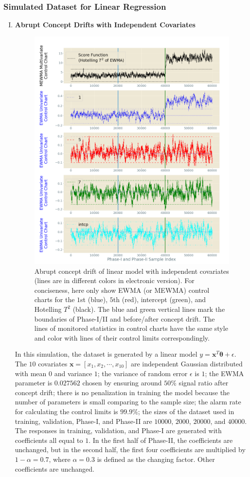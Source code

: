 \documentclass[twoside,11pt]{article}
\begin{document}
\subsubsection{Simulated Dataset for Linear Regression}
\begin{enumerate}[(I)]
\item
\textbf{Abrupt Concept Drifts with Independent Covariates}

\label{sss:lin_ind_pred}
\begin{figure}[!hpt]
\centering
  \includegraphics[width = 0.6\linewidth]{../figures/v14/sim_2/reg/neg_single_3_sim2_mlines_with_regu_1e-08_0_005.png}
  \caption{Abrupt concept drift of linear model with independent covariates (lines are in different colors in electronic version). For conciseness, here only show EWMA (or MEWMA) control charts for the $1$st (blue), $5$th (red), intercept (green), and Hotelling $T^2$ (black). The blue and green vertical lines mark the boundaries of Phase-I/II and before/after concept drift. The lines of monitored statistics in control charts have the same style and color with lines of their control limits correspondingly.}
  \label{fig:lin_reg_ind_X}
\end{figure}
In this simulation, the dataset is generated by a {linear} model $y = \bm {x}^T\bm { \theta} + \epsilon$. The $10$ {covariates} {$\bm {x}=[x_1, x_2, \cdots, x _{10}]$} are independent Gaussian distributed with mean $0$ and variance $1$; the variance of random error $ \epsilon$ is $1$; the EWMA parameter is $0.027562$ chosen by ensuring around $50\%$ signal ratio after concept drift; there is no penalization in training the model because the number of parameters is small comparing to the sample size; the alarm rate for calculating the control limits is $99.9\%$; the sizes of the dataset used in training, validation, Phase-I, and Phase-II are $10000$, $2000$, $20000$, and $40000$. The responses in training, validation, and Phase-I are generated with coefficients all equal to $1$. In the first half of Phase-II, the coefficients are unchanged, but in the second half, the first four coefficients are multiplied by $1- \alpha=0.7$, where $ \alpha=0.3$ is defined as the changing factor. Other coefficients are unchanged.

\end{enumerate}
\end{document}
